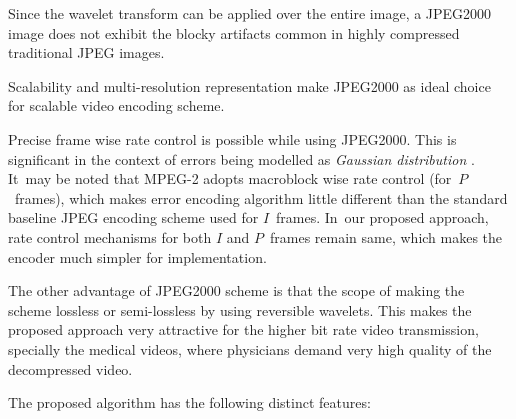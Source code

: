 \documentclass{doublecol-new}
\theoremstyle{TH}{
\newtheorem{lemma}{Lemma}[section]
\newtheorem{theorem}{Theorem}
\newtheorem{corrolary}{Corrolary}
\newtheorem{conjecture}[lemma]{Conjecture}
\newtheorem{proposition}[lemma]{Proposition}
\newtheorem{claim}[lemma]{Claim}
\newtheorem{stheorem}[lemma]{Wrong Theorem}
}
\theoremstyle{THrm}{
\newtheorem{definition}{Definition}[section]
\newtheorem{question}{Question}[section]
\newtheorem{remark}{Remark}[section]
\newtheorem{scheme}{Scheme}
}
\theoremstyle{THhit}{
\newtheorem{case}{Case}[section]
}
\begin{document}
\begin{NLh}{4}
\item[1] Since the wavelet transform can be applied over the
entire image, a JPEG2000
       image does not exhibit the blocky artifacts common in highly compressed
       traditional JPEG images.

\item[2] Scalability and multi-resolution representation make
JPEG2000 as ideal
       choice for scalable video encoding scheme.

\item[3] Precise frame wise rate control is possible while using
JPEG2000. This is significant in the context of errors being modelled as
{\it Gaussian distribution} \citep{21}. It~may be noted that MPEG-2 adopts
macroblock wise rate control (for~$P$~frames),  which makes error encoding
algorithm little different than the standard
       baseline JPEG encoding scheme used for $I$~frames. In~our proposed
       approach, rate control mechanisms
       for both $I$ and $P$~frames remain same, which makes the
encoder much simpler for
       implementation.

\item[4] The other advantage of JPEG2000 scheme is that the scope
of making the        scheme lossless or semi-lossless by using reversible
wavelets. This makes
        the proposed approach very attractive for the higher
bit rate video transmission,
        specially the medical videos, where physicians demand very high quality
        of the decompressed video.
\end{NLh}

\noindent
 The proposed algorithm has the following distinct
features:
\end{document}
